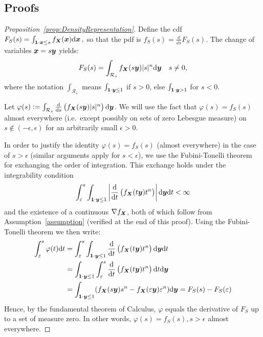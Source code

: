 \begin{subappendices}

\section{Proofs}


\begin{proof}[Proposition~\ref{prop:DensityRepresentation}]

Define the cdf $F_S(s) =\int_{\boldsymbol{1} \cdot \boldsymbol{x} \le s} f_{\boldsymbol{X}}(\boldsymbol{x}) \mathrm{d} \boldsymbol{x} \,,$
so that the pdf is
$
f_S(s) =\frac{\dd}{\dd s}  F_S(s)
$.
The change of variables  $\boldsymbol{x} = s \boldsymbol{y}$ yields:
\[
 F_S(s)=\int_{\mathcal{R}_s} f_{\boldsymbol{X}}(s \boldsymbol{y}) |s|^n \mathrm{d} \boldsymbol{y}\quad s\not =0, 
\]
where the notation $\int_{\mathcal{R}_s}$ means $\int_{\boldsymbol{1}\cdot\boldsymbol{y}\le 1}$ if $s >0$, else $\int_{\boldsymbol{1}\cdot\boldsymbol{y}> 1}$ for $s<0$.

Let $\varphi(s):=\int_{\mathcal{R}_s}\frac{\mathrm{d}}{\mathrm{d} s} \left( f_{\boldsymbol{X}}(s \boldsymbol{y})  |s|^n\right)\mathrm{d} \boldsymbol{y} $. We will use the fact 
that $\varphi(s)=f_S(s)$ almost everywhere (i.e.\ except possibly on sets of zero Lebesgue measure) on $s\not\in(-\epsilon,\epsilon)$ for an arbitrarily small $\epsilon>0$. 


In order to justify  the identity $\varphi(s)=f_S(s)$
(almost everywhere) in the case of 
$s>\epsilon$ (similar arguments apply for $s<\epsilon$),
we use the Fubini-Tonelli theorem for exchanging the order of
integration. This exchange 
holds under the integrability condition 
\begin{equation}
\label{integrability}
\int_\varepsilon^s\int_{\boldsymbol{1}\cdot\boldsymbol{y}\le 1}\left|\frac{\mathrm{d}}{\mathrm{d} t} \left( f_{\boldsymbol{X}}(t \boldsymbol{y})  t^n\right)\right|\mathrm{d} \boldsymbol{y}\mathrm{d} t<\infty
\end{equation}
and the existence of a continuous $\nabla f_{\boldsymbol{X}}$, both of which follow from  Assumption~\ref{assumption} (verified at the end of this proof). Using the Fubini-Tonelli theorem \cite{rosenthal2006first} we then write:
\[
\begin{split}
\int_\varepsilon^s\varphi(t)\mathrm{d} t&=\int_\varepsilon^s\int_{\boldsymbol{1}\cdot\boldsymbol{y}\le 1}\frac{\mathrm{d}}{\mathrm{d} t} \left( f_{\boldsymbol{X}}(t \boldsymbol{y})  t^n\right)\mathrm{d} \boldsymbol{y}\mathrm{d} t\\
&=\int_{\boldsymbol{1}\cdot\boldsymbol{y}\le 1}\int_\varepsilon^s\frac{\mathrm{d}}{\mathrm{d} t} \left( f_{\boldsymbol{X}}(t \boldsymbol{y})  t^n\right)\mathrm{d} t\mathrm{d} \boldsymbol{y}\\
&=\int_{\boldsymbol{1}\cdot\boldsymbol{y}\le 1} ( f_{\boldsymbol{X}}(s \boldsymbol{y})  s^n -
 f_{\boldsymbol{X}}(\varepsilon \boldsymbol{y})  \varepsilon^n)\mathrm{d} \boldsymbol{y}=F_S(s)-F_S(\varepsilon)
\end{split}
\]
Hence, by the fundamental theorem of Calculus,   $\varphi$ equals the  derivative of $F_S$ up to a set of measure zero. 
In other words, $\varphi(s)=f_S(s),s>\epsilon$ almost everywhere. 




\end{proof}
\end{subappendices}
